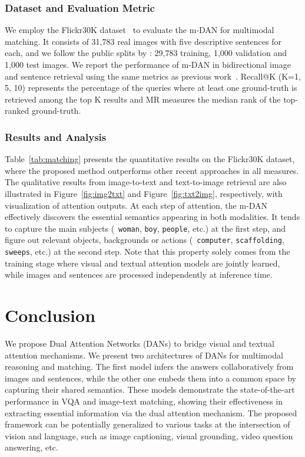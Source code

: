 \documentclass[10pt,twocolumn,letterpaper]{article}
\begin{document}
\subsubsection{Dataset and Evaluation Metric}
We employ the Flickr30K dataset~\cite{young2014image} to evaluate the m-DAN for multimodal matching.
It consists of 31,783 real images with five descriptive sentences for each, and we follow the public splits by \cite{mao2015deep}: 29,783 training, 1,000 validation and 1,000 test images.
We report the performance of m-DAN in bidirectional image and sentence retrieval using the same metrics as previous work~\cite{yan2015deep,ma2015multimodal,mao2015deep,wang2016learning}.
Recall@K (K=1, 5, 10) represents the percentage of the queries where at least one ground-truth is retrieved among the top K results and MR measures the median rank of the top-ranked ground-truth.

\subsubsection{Results and Analysis}
Table~\ref{tab:matching} presents the quantitative results on the Flickr30K dataset, where the proposed method outperforms other recent approaches in all measures.
The qualitative results from image-to-text and text-to-image retrieval are also illustrated in Figure~\ref{fig:img2txt} and Figure~\ref{fig:txt2img}, respectively, with visualization of attention outputs.
At each step of attention, the m-DAN effectively discovers the essential semantics appearing in both modalities.
It tends to capture the main subjects (\eg~{\tt woman}, {\tt boy}, {\tt people}, etc.) at the first step, and figure out relevant objects, backgrounds or actions (\eg~{\tt computer}, {\tt scaffolding}, {\tt sweeps}, etc.) at the second step. 
Note that this property solely comes from the training stage where visual and textual attention models are jointly learned, while images and sentences are processed independently at inference time.

\section{Conclusion}
We propose Dual Attention Networks (DANs) to bridge visual and textual attention mechanisms.
We present two architectures of DANs for multimodal reasoning and matching.
The first model infers the answers collaboratively from images and sentences, while the other one embeds them into a common space by capturing their shared semantics.
These models demonstrate the state-of-the-art performance in VQA and image-text matching, showing their effectiveness in extracting essential information via the dual attention mechanism.
The proposed framework can be potentially generalized to various tasks at the intersection of vision and language, such as image captioning, visual grounding, video question answering, etc. 

{\small


}
\end{document}
